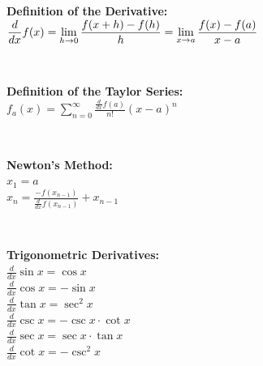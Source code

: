 
\begin{minipage}{\textwidth}
    \textbf{Definition of the Derivative:}
    \\ \( \displaystyle\frac{ d }{ dx } f( x ) = \displaystyle\lim_{h \rightarrow{0}} { \displaystyle\frac{ f( x + h ) - f( h ) }{ h } }
    \\ = \displaystyle\lim_{x \rightarrow{a}} { \displaystyle\frac{ f( x ) - f( a ) }{ x - a } } \)
\end{minipage}
\\ \begin{minipage}{\textwidth}
    \textbf{Definition of the Taylor Series:}
    \\ \( f_a( x ) = \displaystyle\sum_{n = 0}^{\infty} { \displaystyle\frac{ \frac{ d }{ dx } f( a ) }{ n! } ( x - a )^n } \)
\end{minipage}
\\ \begin{minipage}{\textwidth}
    \textbf{Newton's Method:}
    \\ \( x_1 = a \)
    \\ \( x_n = \displaystyle\frac{ -f( x_{n - 1} ) }{ \frac{ d }{ dx } f( x_{n - 1} ) } + x_{n - 1} \)
\end{minipage}
\\ \begin{minipage}{\textwidth}
    \textbf{Trigonometric Derivatives:}
    \\ \( \displaystyle\frac{ d }{ dx } \sin x = \cos x \)
    \\ \( \displaystyle\frac{ d }{ dx } \cos x = - \sin x \)
    \\ \( \displaystyle\frac{ d }{ dx } \tan x = \sec^2 x \)
    \\ \( \displaystyle\frac{ d }{ dx } \csc x = - \csc x \cdot \cot x \)
    \\ \( \displaystyle\frac{ d }{ dx } \sec x = \sec x \cdot \tan x \)
    \\ \( \displaystyle\frac{ d }{ dx } \cot x = - \csc^2 x \)
\end{minipage}
